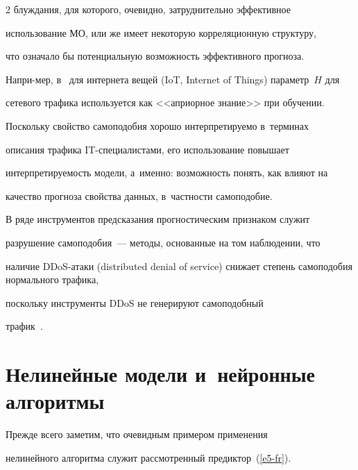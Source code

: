 \begin{multicols}{2}
блуждания, для которого, очевидно, затруднительно эффективное 


использование МО, или же имеет некоторую корреляционную структуру, 


что означало бы потенциальную возможность эффективного прогноза. 


Напри-\linebreak мер, в~\cite{22-fr} для интернета вещей (IoT, Internet of Things) параметр~$H$ для 


сетевого трафика используется как <<априорное знание>> при обуче\-нии. 


\mbox{Поскольку} свойство самоподобия хорошо интерпретируемо в~терминах 


описания трафика IT-спе\-ци\-а\-ли\-ста\-ми, его использование повышает 


ин\-тер\-пре\-ти\-ру\-емость модели, а~именно: воз\-мож\-ность \mbox{понять}, как влияют на 


качество прогноза свойства данных, в~част\-ности самоподобие. 


  


  В ряде инструментов предсказания прогностическим признаком служит 


разрушение самоподобия~--- методы, основанные на том наблюдении, что 


наличие DDoS-ата\-ки (distributed denial of service) снижает степень самоподобия нормального трафика, 


поскольку инструменты DDoS не генерируют самоподобный 


трафик~\cite{14-fr}. 










\section{Нелинейные модели и~нейронные алгоритмы}










  Прежде всего заметим, что очевидным примером применения 


нелинейного алгоритма служит рассмотренный предиктор~(\ref{e5-fr}). 



\end{multicols}
